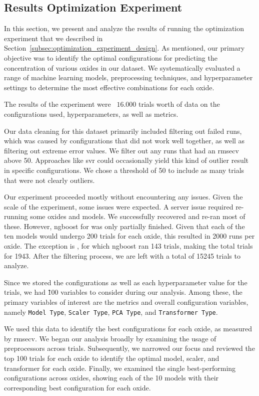\subsection{Results Optimization Experiment}\label{sec:optimization_results}
In this section, we present and analyze the results of running the optimization experiment that we described in Section~\ref{subsec:optimization_experiment_design}.
As mentioned, our primary objective was to identify the optimal configurations for predicting the concentration of various oxides in our dataset.
We systematically evaluated a range of machine learning models, preprocessing techniques, and hyperparameter settings to determine the most effective combinations for each oxide.

The results of the experiment were ~$16.000$ trials worth of data on the configurations used, hyperparameters, as well as metrics.

Our data cleaning for this dataset primarily included filtering out failed runs, which was caused by configurations that did not work well together, as well as filtering out extreme error values.
We filter out any runs that had an \gls{rmsecv} above 50.
Approaches like \gls{svr} could occasionally yield this kind of outlier result in specific configurations.
We chose a threshold of 50 to include as many trials that were not clearly outliers.

Our experiment proceeded mostly without encountering any issues.
Given the scale of the experiment, some issues were expected.
A server issue required re-running some oxides and models. We successfully recovered and re-ran most of these.
However, \gls{ngboost} for  was only partially finished.
Given that each of the ten models would undergo 200 trials for each oxide, this resulted in 2000 runs per oxide.
The exception is , for which \gls{ngboost} ran 143 trials, making the total trials for  1943.
After the filtering process, we are left with a total of 15245 trials to analyze.

Since we stored the configurations as well as each hyperparameter value for the trials, we had \~100 variables to consider during our analysis.
Among these, the primary variables of interest are the metrics and overall configuration variables, namely \texttt{Model Type}, \texttt{Scaler Type}, \texttt{PCA Type}, and \texttt{Transformer Type}.

We used this data to identify the best configurations for each oxide, as measured by \gls{rmsecv}.
We began our analysis broadly by examining the usage of preprocessors across trials. Subsequently, we narrowed our focus and reviewed the top 100 trials for each oxide to identify the optimal model, scaler, and transformer for each oxide.
Finally, we examined the single best-performing configurations across oxides, showing each of the 10 models with their corresponding best configuration for each oxide.


